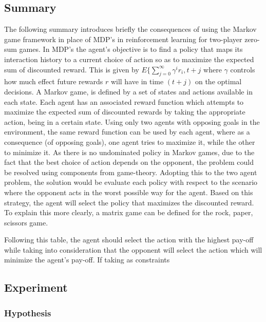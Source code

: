 \documentclass[a4paper,10pt]{article}
\begin{document}
\subsection{Summary}
The following summary introduces briefly the consequences of using the Markov game framework in place of MDP's in reinforcement learning for two-player zero-sum games. In MDP's the agent's objective is to find a policy that maps its interaction history to a current choice of action so as to maximize the expected sum of discounted reward. This is given by $E\{\sum_{j=0}^{\infty}\gamma^ir_i,t+j$ where $\gamma$ controls how much effect future rewards $r$ will have in time $(t+j)$ on the optimal decisions. A Markov game, is defined by a set of states and actions available in each state. Each agent has an associated reward function which attempts to maximize the expected sum of discounted rewards by taking the appropriate action, being in a certain state.
Using only two agents with opposing goals in the environment, the same reward function can be used by each agent, where as a consequence (of opposing goals), one agent tries to maximize it, while the other to minimize it.
As there is no undominated policy in Markov games, due to the fact that the best choice of action depends on the opponent, the problem could be resolved using components from game-theory. Adopting this to the two agent problem, the solution would be evaluate each policy with respect to the scenario where the opponent acts in the worst possible way for the agent. Based on this strategy, the agent will select the policy that maximizes the discounted reward.\\
To explain this more clearly, a matrix game can be defined for the rock, paper, scissors game.


Following this table, the agent should select the action with the highest pay-off while taking into consideration that the opponent will select the action which will minimize the agent's pay-off. If taking as constraints  



\subsection{Experiment}



\subsubsection{Hypothesis}
\end{document}

